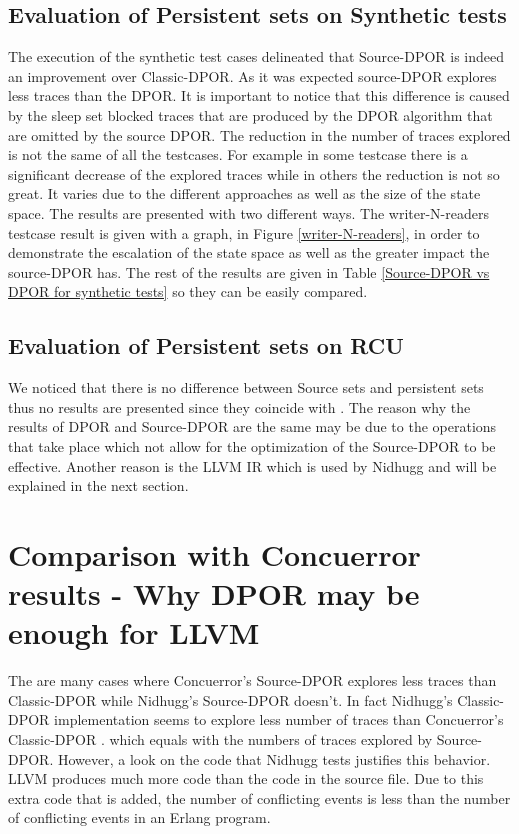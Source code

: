 \subsection{Evaluation of Persistent sets on Synthetic tests}
The execution of the synthetic test cases delineated that Source-DPOR is indeed an improvement over Classic-DPOR. As it was expected source-DPOR explores less 
traces than the DPOR. It is important
to notice that this difference is caused by the sleep set blocked traces that are produced by the DPOR algorithm that are omitted by the source DPOR. 
The reduction in the number of traces explored is not the same of all the testcases. For example in some testcase there is a
significant decrease of the explored traces while in others the reduction is not so great. 
It varies due to the different approaches as well as the size of the state space. The results are presented with two different ways. 
The writer-N-readers testcase result is given with a graph, in Figure \ref{writer-N-readers}, in order to demonstrate the escalation of the state space as well as the greater impact the source-DPOR has. The rest of the
results are given in Table \ref{Source-DPOR vs DPOR for synthetic tests} so they can be easily compared.



\subsection{Evaluation of Persistent sets on RCU}
We noticed that there is no difference between Source sets and persistent sets thus no results are presented since they coincide with \cite{Spin}. 
The reason why the results of DPOR and Source-DPOR are the same may be due to the operations that take place which not allow for the optimization of the Source-DPOR 
to be effective. Another reason is the LLVM IR which is used by Nidhugg and will be explained in the next section.

\section{Comparison with Concuerror results - Why DPOR may be enough for LLVM}
The are many cases where Concuerror's Source-DPOR explores less traces than Classic-DPOR while Nidhugg's Source-DPOR doesn't. 
In fact Nidhugg's Classic-DPOR implementation seems to explore less number of traces than Concuerror's Classic-DPOR \cite{AbdullaAronisJohnssonSagonasDPOR2014}.
which equals with the numbers of traces explored by Source-DPOR. However, a look on the code that Nidhugg tests justifies this behavior.
LLVM produces much more code than the code in the source file. Due to this extra code that is added, the number of conflicting events is less than the 
number of conflicting events in an Erlang program.

